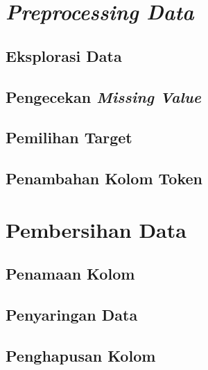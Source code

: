 \documentclass[ugmtesis]{ugmtesis}
\begin{document}
	\section{\textit{Preprocessing Data}}
	\label{implementasi preprocessing data}
	

		\subsection{Eksplorasi Data}
		\label{implementasi eksplorasi data}
		

		\subsection{Pengecekan \textit{Missing Value}}
		\label{implementasi pengecekan missing value}
		
		
		\subsection{Pemilihan Target}
		\label{implementasi pemilihan target}
		

		\subsection{Penambahan Kolom Token}
		\label{implementasi penambahan kolom token}
		

	\section{Pembersihan Data}
	\label{implementasi pembersihan data}
	

		\subsection{Penamaan Kolom}
		\label{implementasi penamaan kolom}
		

		\subsection{Penyaringan Data}
		\label{implementasi penyaringan data}
		

		\subsection{Penghapusan Kolom}
		\label{implementasi penghapusan kolom}
		
\end{document}
